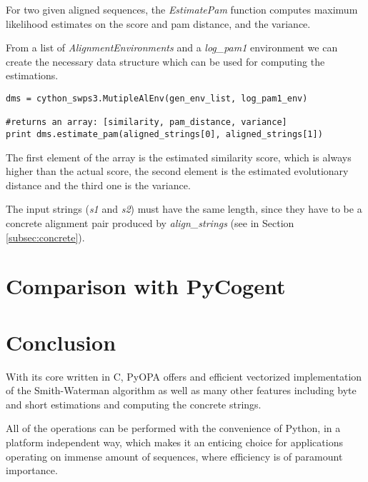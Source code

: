 \documentclass[12pt]{article}
\newcommand{\pp}{PyOPA}
\begin{document}
For two given aligned sequences, the \emph{EstimatePam} function computes maximum likelihood estimates on the score and pam distance, and the variance. 

From a list of \emph{AlignmentEnvironments} and a \emph{log\_pam1} environment we can create the necessary data structure which can be used for computing the estimations.

\begin{lstlisting}
dms = cython_swps3.MutipleAlEnv(gen_env_list, log_pam1_env)

#returns an array: [similarity, pam_distance, variance]
print dms.estimate_pam(aligned_strings[0], aligned_strings[1])
\end{lstlisting}

The first element of the array is the estimated similarity score, which is always higher than the actual score, the second element is the estimated evolutionary distance and the third one is the variance.

The input strings (\emph{s1} and \emph{s2}) must have the same length, since they have to be a concrete alignment pair produced by \emph{align\_strings} (see in Section \ref{subsec:concrete}).

\section{Comparison with PyCogent}
\label{sec:compCogent}

\section{Conclusion}
\label{sec:concl}

With its core written in C, \pp{} offers and efficient vectorized implementation of the Smith-Waterman algorithm as well as many other features including byte and short estimations and computing the concrete strings.

All of the operations can be performed with the convenience of Python, in a platform independent way, which makes it an enticing choice for applications operating on immense amount of sequences, where efficiency is of paramount importance.
\end{document}
